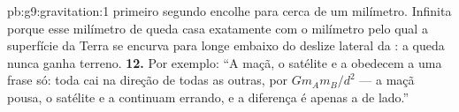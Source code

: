\begin{solution}{pb:g9:gravitation:1}
primeiro segundo encolhe para cerca de um milímetro. Infinita porque
esse milímetro de queda casa exatamente com o milímetro pelo qual a
superfície da Terra se encurva para longe embaixo do deslize lateral
da : a queda nunca ganha terreno.
\textbf{12.} Por exemplo: ``A maçã, o satélite e a  obedecem a uma
frase só: toda  cai na direção de todas as outras, por
$G m_A m_B / d^2$ --- a maçã pousa, o satélite e a  continuam
errando, e a diferença é apenas a  de lado.''
\end{solution}
